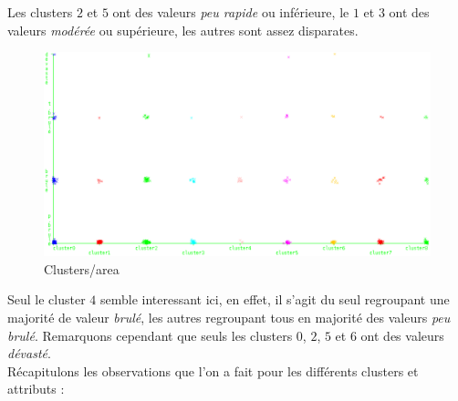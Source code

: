 \documentclass{article}
\begin{document}
\begin{sffamily}
Les clusters $2$ et $5$ ont des valeurs \textit{peu rapide} ou inférieure, le $1$ et $3$ ont des valeurs \textit{modérée} ou supérieure, 
les autres sont assez disparates.

\newpage

\begin{figure}[h!]
    \begin{center}
    \includegraphics[width=\textwidth]{img_016.pdf}
    \caption{Clusters/area}
    \end{center}	
\end{figure}

Seul le cluster $4$ semble interessant ici, en effet, il s'agit du seul regroupant une majorité de valeur \textit{brulé}, les autres 
regroupant tous en majorité des valeurs \textit{peu brulé}. Remarquons cependant que seuls les clusters $0$, $2$, $5$ et $6$ ont des 
valeurs \textit{dévasté}. \\

Récapitulons les observations que l'on a fait pour les différents clusters et attributs :


\end{sffamily}
\end{document}
